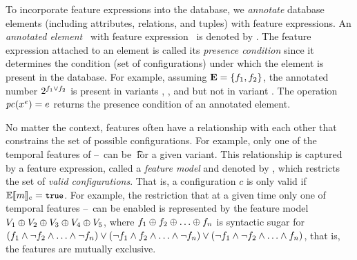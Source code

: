 To incorporate feature expressions into the database,
we \emph{annotate} database elements (including attributes, relations, and tuples) 
with feature expressions. An \emph{annotated element} \elem\ with feature expression \dimMeta\
is denoted by \annot \elem. 
%
The feature expression attached to an element is called its \emph{presence
condition} since it determines the condition (set of configurations) under
which the element is present in the database. For example, assuming
$\ffSet=\set{\A,\B}$, the annotated number $\annot [\A \vee \B] 2$ is present
in variants \setDef{\A}, \setDef{\B}, and \setDef{\A,\B} but not in variant
\setDef{}.
%
The operation $\getPC{\annot{\elem}}=e$ returns the presence condition of an
annotated element.

No matter the context, features often have a relationship with each other that
constrains the set of possible configurations. For example, only one of the
temporal features of \vOne--\vFive\ can be \t\ for a given variant. This
relationship is captured by a feature expression, called a \emph{feature model}
and denoted by \fModel, which restricts the set of \emph{valid configurations}.
That is, a configuration $c$ is only valid if $\fSem{\fModel}=\t$.
%
For example, the restriction that at a given time only one of temporal features
\vOne--\vFive\ 
can be enabled is represented by the feature model
$\vOne \oplus \vTwo \oplus \vThree \oplus \vFour \oplus \vFive$,
where $\A \oplus \B \oplus \ldots \oplus \fName_n$ is syntactic sugar for
$(\A \wedge \neg \B \wedge \ldots \wedge \neg \fName_n)
\vee (\neg \A \wedge \B \wedge \ldots \wedge \neg \fName_n)
\vee (\neg \A \wedge \neg \B \wedge \ldots \wedge \fName_n)$,
that is, the features are mutually exclusive.







